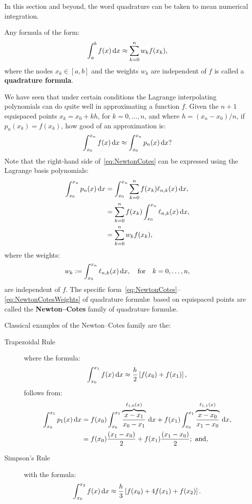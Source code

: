 In this section and beyond, the word quadrature can be taken to mean numerical integration.
\begin{definition}
Any formula of the form:
\[
\int_a^b f(x){\rm\,d} x \approx \sum_{k=0}^n w_k f(x_k),
\]
where the nodes $x_k\in[a,b]$ and the weights $w_k$ are independent of $f$ is called a {\bf quadrature formula}.
\end{definition}
We have seen that under certain conditions the Lagrange interpolating polynomials can do quite well in approximating a function $f$. Given the $n+1$ equispaced points $x_k = x_0+kh$, for $k=0,\ldots,n$, and where $h=(x_n-x_0)/n$, if $p_n(x_k) = f(x_k)$, how good of an approximation is:
\begin{equation}\label{eq:NewtonCotes}
\int_{x_0}^{x_n} f(x){\rm\,d} x \approx \int_{x_0}^{x_n} p_n(x){\rm\,d} x ?
\end{equation}
Note that the right-hand side of~\eqref{eq:NewtonCotes} can be expressed using the Lagrange basis polynomials:
\begin{align}
\int_{x_0}^{x_n} p_n(x){\rm\,d} x & = \int_{x_0}^{x_n} \sum_{k=0}^n f(x_k) \ell_{n,k}(x){\rm\,d} x,\nonumber\\
& = \sum_{k=0}^n f(x_k) \int_{x_0}^{x_n} \ell_{n,k}(x){\rm\,d} x,\\
& = \sum_{k=0}^n w_k f(x_k),\nonumber
\end{align}
where the weights:
\begin{equation}\label{eq:NewtonCotesWeights}
w_k := \int_{x_0}^{x_n} \ell_{n,k}(x){\rm\,d} x,\quad{\rm for}\quad k=0,\ldots,n,
\end{equation}
are independent of $f$. The specific form~\eqref{eq:NewtonCotes}--\eqref{eq:NewtonCotesWeights} of quadrature formul\ae~based on equispaced points are called the {\bf Newton--Cotes} family of quadrature formul\ae.

Classical examples of the Newton--Cotes family are the:
\begin{description}
\item[Trapezoidal Rule] where the formula:
\[
\int_{x_0}^{x_1}f(x)\ud x \approx \dfrac{h}{2}\br[f(x_0)+f(x_1)],
\]
follows from:
\begin{align*}
\int_{x_0}^{x_1}p_1(x){\rm\,d} x & = f(x_0)\int_{x_0}^{x_1}\overbrace{\dfrac{x-x_1}{x_0-x_1}}^{\ell_{1,0}(x)}{\rm\,d} x + f(x_1)\int_{x_0}^{x_1}\overbrace{\dfrac{x-x_0}{x_1-x_0}}^{\ell_{1,1}(x)}{\rm\,d} x,\\
& = f(x_0)\dfrac{(x_1-x_0)}{2} + f(x_1)\dfrac{(x_1-x_0)}{2};\hbox{ and},
\end{align*}
\item[Simpson's Rule] with the formula:
\[
\int_{x_0}^{x_2}f(x)\ud x \approx \dfrac{h}{3}\br[f(x_0)+4f(x_1)+f(x_2)].
\]
\end{description}

